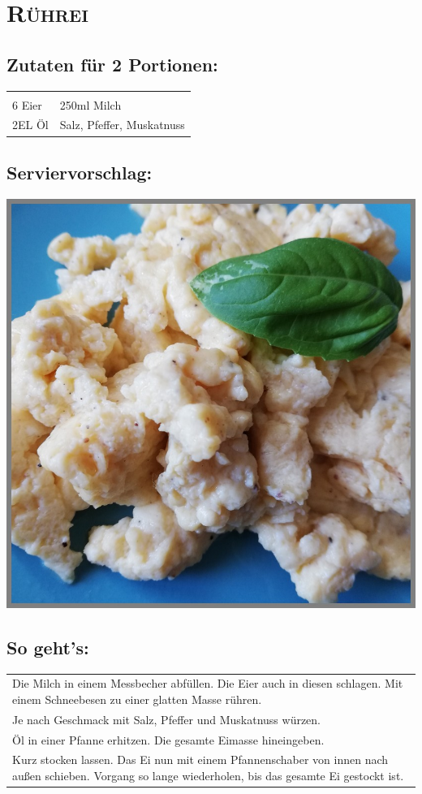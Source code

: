 \section{\textsc{Rührei}}

\subsection*{Zutaten für 2 Portionen:}

\begin{tabular}{p{7.5cm} p{7.5cm}}
	& \\
	6 Eier & 250ml Milch \\
	2EL Öl & Salz, Pfeffer, Muskatnuss
\end{tabular}

\subsection*{Serviervorschlag:}

\includegraphics[width=\textwidth]{img/ruehrei.jpg} \cite{ruehrei}

\subsection*{So geht's:}

\begin{tabular}{p{15cm}}
	\\
	Die Milch in einem Messbecher abfüllen. Die Eier auch in diesen schlagen. Mit einem Schneebesen zu einer glatten Masse rühren.\\
	Je nach Geschmack mit Salz, Pfeffer und Muskatnuss würzen.\\
	Öl in einer Pfanne erhitzen. Die gesamte Eimasse hineingeben.\\
	Kurz stocken lassen. Das Ei nun mit einem Pfannenschaber von innen nach außen schieben. Vorgang so lange wiederholen, bis das gesamte Ei gestockt ist.
\end{tabular}
